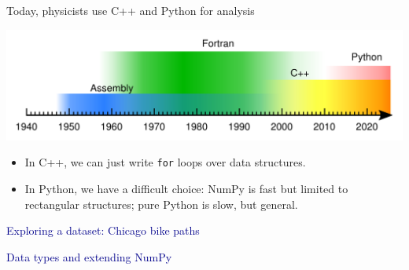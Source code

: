 \documentclass[aspectratio=169]{beamer}
\begin{document}
\begin{frame}{Today, physicists use C++ and Python for analysis}
\large
\vspace{0.25 cm}

\includegraphics[width=\linewidth]{img/programming-languages.pdf}

\vspace{0.2 cm}
\begin{itemize}\setlength{\itemsep}{0.2 cm}
\item<2-> In C++, we can just write \texttt{for} loops over data structures.
\item<3-> In Python, we have a difficult choice: NumPy is fast but limited to rectangular structures; pure Python is slow, but general.
\end{itemize}

\vspace{0.2 cm}
\Large
\begin{center}
\begin{minipage}{0.85\linewidth}
\begin{center}
\end{center}
\end{minipage}
\end{center}
\end{frame}

\begin{frame}{}
\Huge
\vspace{1 cm}
\begin{center}
\textcolor{darkblue}{Exploring a dataset: Chicago bike paths}
\end{center}
\end{frame}

\begin{frame}{}
\Huge
\vspace{1 cm}
\begin{center}
\textcolor{darkblue}{Data types and extending NumPy}
\end{center}
\end{frame}
\end{document}
